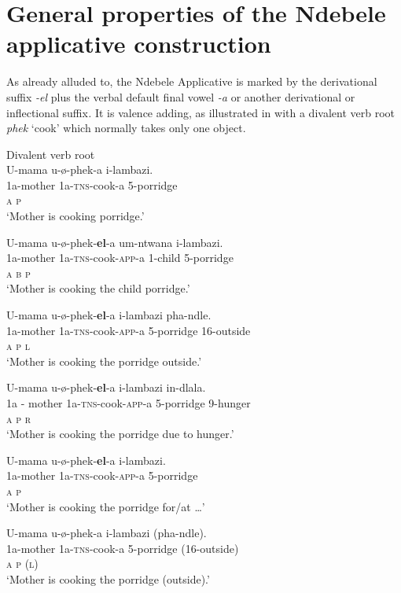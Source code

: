 \documentclass[output=paper]{langsci/langscibook}
\begin{document}
\section {General properties of the Ndebele applicative construction}

As already alluded to, the Ndebele Applicative is marked by the derivational suffix \textit{-el }plus the verbal default final vowel \textit{-a} or another derivational or inflectional suffix\textit{.} It is valence adding, as illustrated in  with a divalent verb root \textit{phek} ‘cook’ which normally takes only one object. 

\ea
{Divalent verb root }\\
\ea
\gll U-mama u-ø-phek-a i-lambazi.\\
 \textit {}1a-mother 1a-\textsc{tns}-cook-a 5-porridge\\
 \textsc{a p}\\
\glt ‘Mother is cooking porridge.’

\ex
\gll U-mama u-ø-phek-\textbf{el}-a um-ntwana i-lambazi. \\
 \textit {}1a-mother 1a-\textsc{tns}-cook-\textsc{app}-a 1-child 5-porridge\\
 \textit {}\textsc{a b p}\\
\glt ‘Mother is cooking the child porridge.’

\ex
\gll U-mama u-ø-phek-\textbf{el}-a i-lambazi pha-ndle.\\
 1a-mother 1a-\textsc{tns}-cook-\textsc{app}-a 5-porridge 16-outside\\
 \textsc{a p l}\\
\glt ‘Mother is cooking the porridge outside.’

\ex
\gll U-mama u-ø-phek-\textbf{el}-a i-lambazi in-dlala.\\
 1a - mother 1a-\textsc{tns}-cook-\textsc{app}-a 5-porridge 9-hunger\\
 \textsc{a p r}\\
\glt ‘Mother is cooking the porridge due to hunger.’

\ex
\gll *U-mama u-ø-phek-\textbf{el}-a i-lambazi.\\
 1a-mother 1a-\textsc{tns}-cook-\textsc{app}-a 5-porridge \\
 \textsc{a p}\\
\glt ‘Mother is cooking the porridge for/at …’

\ex
\gll U-mama u-ø-phek-a i-lambazi (pha-ndle).\\
 1a-mother 1a-\textsc{tns}-cook-a 5-porridge (16-outside)\\
 \textsc{a p (l)}\\
\glt ‘Mother is cooking the porridge (outside).’
\z
\z
\end{document}
